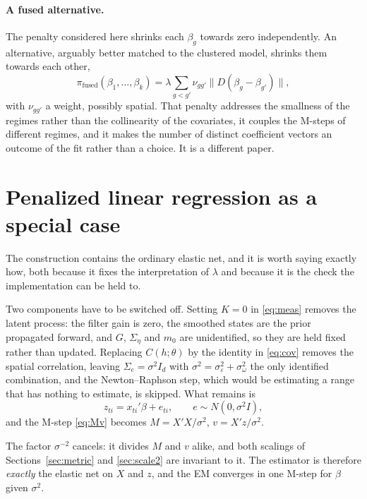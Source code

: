\documentclass[11pt,a4paper]{article}
\newcommand{\Sig}{\Sigma}
\newcommand{\Se}{\Sig_{e}}
\begin{document}
\paragraph{A fused alternative.} The penalty considered here shrinks each
$\beta_g$ towards zero independently. An alternative, arguably better matched to
the clustered model, shrinks them towards each other,
\[
  \pi_{\mathrm{fused}}(\beta_1,\dots,\beta_k)
  = \lambda \sum_{g < g'} \nu_{gg'} \lVert D(\beta_g - \beta_{g'})\rVert,
\]
with $\nu_{gg'}$ a weight, possibly spatial. That penalty addresses the
smallness of the regimes rather than the collinearity of the covariates, it
couples the M-steps of different regimes, and it makes the number of distinct
coefficient vectors an outcome of the fit rather than a choice. It is a
different paper.

\section{Penalized linear regression as a special case}
\label{sec:lm}

The construction contains the ordinary elastic net, and it is worth saying
exactly how, both because it fixes the interpretation of $\lambda$ and because
it is the check the implementation can be held to.

Two components have to be switched off. Setting $K = 0$ in \eqref{eq:meas}
removes the latent process: the filter gain is zero, the smoothed states are
the prior propagated forward, and $G$, $\Sigma_\eta$ and $m_0$ are
unidentified, so they are held fixed rather than updated. Replacing
$C(h;\theta)$ by the identity in \eqref{eq:cov} removes the spatial
correlation, leaving $\Se = \sigma^2 I_d$ with $\sigma^2 = \sigma^2_\varepsilon
+ \sigma^2_\omega$ the only identified combination, and the Newton--Raphson
step, which would be estimating a range that has nothing to estimate, is
skipped. What remains is
\begin{equation}
  z_{ti} = x_{ti}'\beta + e_{ti},
  \qquad e \sim N(0, \sigma^2 I),
  \label{eq:lm}
\end{equation}
and the M-step \eqref{eq:Mv} becomes $M = X'X/\sigma^2$, $v = X'z/\sigma^2$.

The factor $\sigma^{-2}$ cancels: it divides $M$ and $v$ alike, and both
scalings of Sections~\ref{sec:metric} and \ref{sec:scale2} are invariant to it.
The estimator is therefore \emph{exactly} the elastic net on $X$ and $z$, and
the EM converges in one M-step for $\beta$ given $\sigma^2$.
\end{document}
